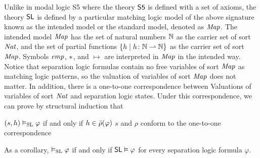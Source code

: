 \documentclass{amsart}
\begin{document}
Unlike in modal logic S5 where the theory $\MLSfive$ is defined with a set of
axioms,
the theory $\MLSL$ is defined by 
a particular matching logic model 
of the above signature
known as the intended model or the standard model, denoted as $\Map$.
The intended model $\Map$ has the set of natural numbers $\N$ as the carrier
set of sort $\Nat$,
and the set of partial functions 
$ \{ h \mid h \colon \N \pto \N \} $
as the carrier set of sort $\Map$.
Symbols $\emp$, $\merge$, and $\mapsto$ are interpreted in $\Map$ in the
intended way.
Notice that separation logic formulas contain no free variables of sort $\Map$
as matching logic patterns,
so the valuation of variables of sort $\Map$ does not matter.
In addition, there is a one-to-one correspondence between 
Valuations of variables of sort $\Nat$ and separation logic states.
Under this correspondence, we can prove by structural induction that
\begin{center}
$(s,h) \vDash_\SL \varphi$
 if and only if 
$h \in \rhobar(\varphi)$
\quad \doubleslash $s$ and $\rho$ conform to the one-to-one correspondence
\end{center}
As a corollary,
$\vDash_\SL \varphi$ if and only if
$\MLSL \vDash \varphi$ for every separation logic formula $\varphi$.
\end{document}
